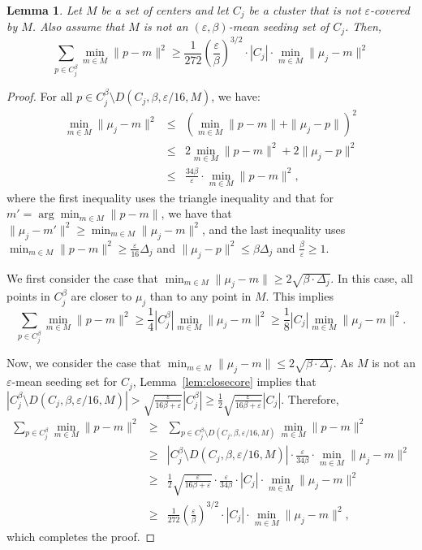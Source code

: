 \documentclass[10pt,a4paper]{amsart}
\newtheorem{lemma}[theorem]{Lemma}
\begin{document}
\begin{lemma}
\label{lem:lbdist}
Let $M$ be a set of centers and let $C_j$ be a cluster that is not $\varepsilon$-covered by $M$. Also assume that $M$ is 
not an $(\varepsilon,\beta)$-mean seeding set of $C_j$. Then,
$$\sum_{p\in C_j^\beta} \min_{m\in M}\|p-m\|^2 \geq \frac{1}{272}\left(\frac{\varepsilon}{\beta}\right)^{3/2}\cdot |C_j| \cdot \min_{m\in M}\|\mu_j-m\|^2$$
\end{lemma}
\begin{proof}
For all $p\in C_j^\beta\setminus D(C_j,\beta,\varepsilon/16,M)$, we have:
\begin{eqnarray*}
       \min_{m\in M}\|\mu_j-m\|^2 
&\leq& \left(\min_{m\in M}\|p-m\| + \|\mu_j-p\|\right)^2 \\
&\leq& 2\min_{m\in M}\|p-m\|^2 + 2\|\mu_j-p\|^2 \\
&\leq& \frac{34\beta}{\varepsilon}\cdot\min_{m\in M}\|p-m\|^2,
\end{eqnarray*}
where the first inequality uses the triangle inequality and that for $m' = \arg\min_{m\in M}\|p-m\|$, we have that $\|\mu_j-m'\|^2\ge \min_{m\in M}\|\mu_j-m\|^2$, and the last inequality uses $\min_{m\in M}\|p-m\|^2\ge \frac{\varepsilon}{16}\Delta_j$ 
and $\|\mu_j-p\|^2\le \beta\Delta_j$ and $\frac{\beta}{\varepsilon} \ge 1$.

We first consider the case that $\min_{m\in M}\|\mu_j-m\| \geq 2\sqrt{\beta\cdot \Delta_j}$. In this case, all points in $C_j^\beta$ are closer to $\mu_j$ than to any point in $M$.
This implies 
$$\sum_{p\in C_j^\beta} \min_{m\in M}\|p-m\|^2 \geq \frac{1}{4}|C_j^\beta| \min_{m\in M}\|\mu_j-m\|^2 \geq \frac{1}{8}|C_j|\min_{m\in M}\|\mu_j-m\|^2.$$

Now, we consider the case that $\min_{m\in M}\|\mu_j-m\| \leq 2\sqrt{\beta\cdot \Delta_j}$.
As $M$ is not an $\varepsilon$-mean seeding set for $C_j$, Lemma~\ref{lem:closecore} implies that
$|C_j^\beta\setminus D(C_j,\beta,\varepsilon/16,M)| > \sqrt{\frac{\varepsilon}{16\beta+\varepsilon}} |C_j^\beta|\ge \frac 1 2 \sqrt{\frac{\varepsilon}{16\beta+\varepsilon}} |C_j|$. Therefore,
\begin{eqnarray*}
      \sum_{p\in C_j^\beta} \min_{m\in M}\|p-m\|^2
&\ge& \sum_{p\in C_j^\beta\setminus D(C_j,\beta,\varepsilon/16,M)} \min_{m\in M}\|p-m\|^2 \\
&\ge& |C_j^\beta\setminus D(C_j,\beta,\varepsilon/16,M)|\cdot \frac{\varepsilon}{34\beta}\cdot\min_{m\in M}\|\mu_j-m\|^2 \\
&\ge& \frac 1 2 \sqrt{\frac{\varepsilon}{16\beta + \varepsilon}}\cdot\frac{\varepsilon}{34\beta}\cdot |C_j|\cdot\min_{m\in M}\|\mu_j-m\|^2 \\
&\ge& \frac{1}{272}\left(\frac{\varepsilon}{\beta}\right)^{3/2}\cdot |C_j|\cdot\min_{m\in M}\|\mu_j-m\|^2,
\end{eqnarray*}
which completes the proof.
\end{proof}
\end{document}
